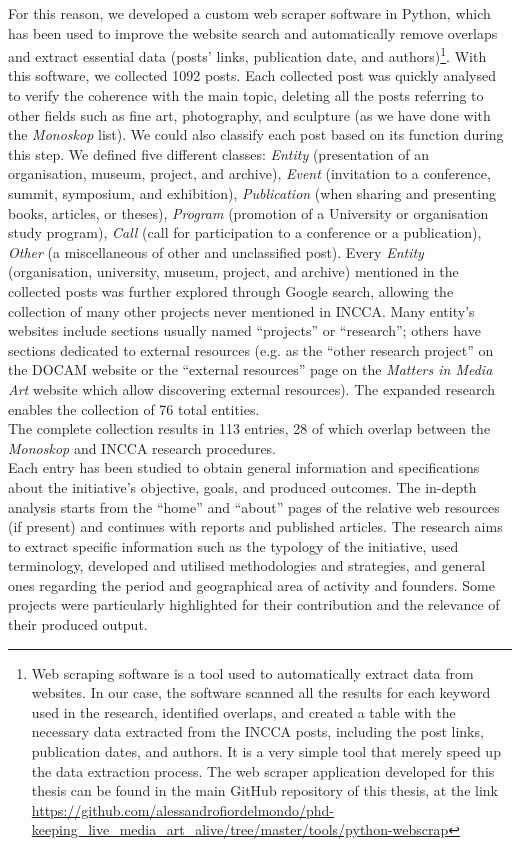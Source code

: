 For this reason, we developed a custom web scraper software in Python, which has been used to improve the website search and automatically remove overlaps and extract essential data (posts’ links, publication date, and authors)\footnote{Web scraping software is a tool used to automatically extract data from websites. In our case, the software scanned all the results for each keyword used in the research, identified overlaps, and created a table with the necessary data extracted from the INCCA posts, including the post links, publication dates, and authors. It is a very simple tool that merely speed up the data extraction process. The web scraper application developed for this thesis can be found in the main GitHub repository of this thesis, at the link \url{https://github.com/alessandrofiordelmondo/phd-keeping_live_media_art_alive/tree/master/tools/python-webscrap}}. With this software, we collected 1092 posts. Each collected post was quickly analysed to verify the coherence with the main topic, deleting all the posts referring to other fields such as fine art, photography, and sculpture (as we have done with the \textit{Monoskop} list). We could also classify each post based on its function during this step. We defined five different classes: \textit{Entity} (presentation of an organisation, museum, project, and archive), \textit{Event} (invitation to a conference, summit, symposium, and exhibition), \textit{Publication} (when sharing and presenting books, articles, or theses), \textit{Program} (promotion of a University or organisation study program), \textit{Call} (call for participation to a conference or a publication), \textit{Other} (a miscellaneous of other and unclassified post). Every \textit{Entity} (organisation, university, museum, project, and archive) mentioned in the collected posts was further explored through Google search, allowing the collection of many other projects never mentioned in INCCA. Many entity's websites include sections usually named ``projects'' or ``research''; others have sections dedicated to external resources (e.g. as the ``other research project'' on the DOCAM website or the ``external resources'' page on the \textit{Matters in Media Art} website which allow discovering external resources). The expanded research enables the collection of 76 total entities.\\
The complete collection results in 113 entries, 28 of which overlap between the \textit{Monoskop} and INCCA research procedures.\\
\newline
Each entry has been studied to obtain general information and specifications about the initiative’s objective, goals, and produced outcomes. The in-depth analysis starts from the ``home'' and ``about'' pages of the relative web resources (if present) and continues with reports and published articles. The research aims to extract specific information such as the typology of the initiative, used terminology, developed and utilised methodologies and strategies, and general ones regarding the period and geographical area of activity and founders. Some projects were particularly highlighted for their contribution and the relevance of their produced output.

